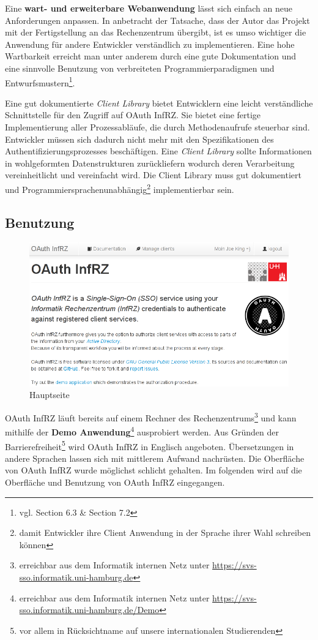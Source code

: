 \documentclass[12pt,a4paper,pointednumbers,abstracton]{scrartcl}
\begin{document}
Eine \textbf{wart- und erweiterbare  Webanwendung} lässt sich einfach an neue Anforderungen anpassen.
In anbetracht der Tatsache, dass der Autor das Projekt mit der Fertigstellung an das Rechenzentrum übergibt, ist es umso wichtiger die Anwendung für andere Entwickler verständlich zu implementieren.
Eine hohe Wartbarkeit erreicht man unter anderem durch eine gute Dokumentation und eine sinnvolle Benutzung von verbreiteten Programmierparadigmen und Entwurfsmustern\footnote{vgl. \cite{Som2010} Section 6.3 \& Section 7.2}.

Eine gut dokumentierte \emph{Client Library} bietet Entwicklern eine leicht verständliche Schnittstelle für den Zugriff auf OAuth InfRZ.
Sie bietet eine fertige Implementierung aller Prozessabläufe, die durch Methodenaufrufe steuerbar sind.
Entwickler müssen sich dadurch nicht mehr mit den Spezifikationen des Authentifizierungsprozesses beschäftigen.
Eine \emph{Client Library} sollte Informationen in wohlgeformten Datenstrukturen zurückliefern wodurch deren Verarbeitung vereinheitlicht und vereinfacht wird.
Die Client Library muss gut dokumentiert und Programmiersprachenunabhängig\footnote{damit Entwickler ihre Client Anwendung in der Sprache ihrer Wahl schreiben können} implementierbar sein.

\newpage
\subsection{Benutzung}
\label{sec:oauth-infrz/usage}

\begin{figure}[h!]
\centering
\includegraphics[width=15cm]{img/oauth_infrz/home}
\caption{Hauptseite}
\label{pic:oauth_infrz/home}
\end{figure}

OAuth InfRZ läuft bereits auf einem Rechner des Rechenzentrums\footnote{erreichbar aus dem Informatik internen Netz unter \url{https://svs-sso.informatik.uni-hamburg.de}} und kann mithilfe der \textbf{Demo Anwendung}\footnote{erreichbar aus dem Informatik internen Netz unter \url{https://svs-sso.informatik.uni-hamburg.de/Demo}} ausprobiert werden.
Aus Gründen der Barrierefreiheit\footnote{vor allem in Rücksichtname auf unsere internationalen Studierenden} wird OAuth InfRZ in Englisch angeboten.
Übersetzungen in andere Sprachen lassen sich mit mittlerem Aufwand nachrüsten.
Die Oberfläche von OAuth InfRZ wurde möglichst schlicht gehalten.
Im folgenden wird auf die Oberfläche und Benutzung von OAuth InfRZ eingegangen.
\end{document}
